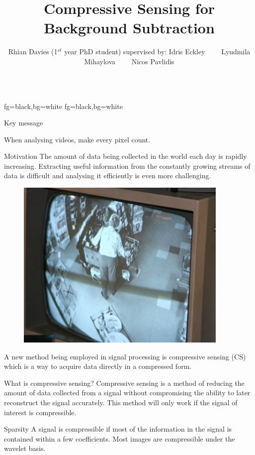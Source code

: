 \documentclass[final]{beamer}
\title{Compressive Sensing for Background Subtraction}
\author{Rhian Davies (1$^{st}$ year PhD student) supervised by: Idris Eckley \ \ \ \  Lyudmila Mihaylova  \ \ \ \ Nicos Pavlidis}
\institute{STOR-i DTC  \ \ \ \ Lancaster University}
\begin{document}
\begin{frame}{}
  \begin{columns}[t]


    \begin{column}{0.24\textwidth}


%
		{fg=black,bg=white}
		{fg=black,bg=white}
			\begin{exampleblock}{\begin{LARGE}Key message\end{LARGE}}
			When analysing videos, make every pixel count.
					\end{exampleblock}  
	\vspace{5pt}


\begin{block}{Motivation}
The amount of data being collected in the world each day is rapidly increasing. Extracting useful information from the constantly growing streams of data is difficult and analysing it efficiently is even more challenging. 

\begin{figure}[h]
  \centering
  \includegraphics{bigbrother.jpg}
\end{figure}
      
A new method being employed in signal processing is compressive sensing (CS) which is a way to acquire data directly in a compressed form.
\end{block}

      \vspace{10pt}

      \begin{block}{What is compressive sensing?}
Compressive sensing is a method of reducing the amount of data collected from a signal without compromising the ability to later reconstruct the signal accurately. This method will only work if the signal of interest is compressible. 
\end{block}
      \vspace{10pt}
\begin{block}{Sparsity}
A signal is compressible if most of the information in the signal is contained within a few coefficients. Most images are compressible under the wavelet basis. 


\end{block}
\end{column}
\end{columns}
\end{frame}
\end{document}

